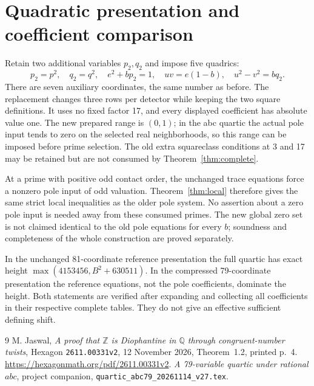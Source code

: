 \documentclass[10pt,a4paper]{article}
\newcommand{\Q}{\mathbb Q}\newcommand{\Z}{\mathbb Z}
\begin{document}
\section{Quadratic presentation and coefficient comparison}
Retain two additional variables $p_2,q_2$ and impose five quadrics:
\begin{equation}\label{eq:quadrics}
 p_2=p^2,\quad q_2=q^2,\quad e^2+bp_2=1,\quad
 uv=e(1-b),\quad u^2-v^2=bq_2.
\end{equation}
There are seven auxiliary coordinates, the same number as before.
The replacement changes three rows per detector while keeping the two
square definitions. It uses no fixed factor 17, and every displayed
coefficient has absolute value one. The new prepared range is $(0,1)$;
in the abc quartic the actual pole input tends to zero on the selected
real neighborhoods, so this range can be imposed before prime selection.
The old extra squareclass conditions at 3 and 17 may be retained but
are not consumed by Theorem~\ref{thm:complete}.

At a prime with positive odd contact order, the unchanged trace equations
force a nonzero pole input of odd valuation. Theorem~\ref{thm:local}
therefore gives the same strict local inequalities as the older pole
system. No assertion about a zero pole input is needed away from these
consumed primes. The new global zero set is not claimed identical to
the old pole equations for every $b$; soundness and completeness of the
whole construction are proved separately.

In the unchanged 81-coordinate reference presentation the full quartic
has exact height $\max(4153456,B^2+630511)$. In the compressed
79-coordinate presentation the reference equations, not the pole
coefficients, dominate the height. Both statements are verified after
expanding and collecting all coefficients in their respective complete
tables. They do not give an effective sufficient defining shift.

\begin{thebibliography}{9}
 M. Jaswal, \emph{A proof that $\Z$ is Diophantine in $\Q$
through congruent-number twists}, Hexagon \texttt{2611.00331v2},
12 November 2026, Theorem~1.2, printed p.~4.
\url{https://hexagonmath.org/pdf/2611.00331v2}.
 \emph{A 79-variable quartic under rational $abc$},
project companion, \nolinkurl{quartic_abc79_20261114_v27.tex}.
\end{thebibliography}
\end{document}
